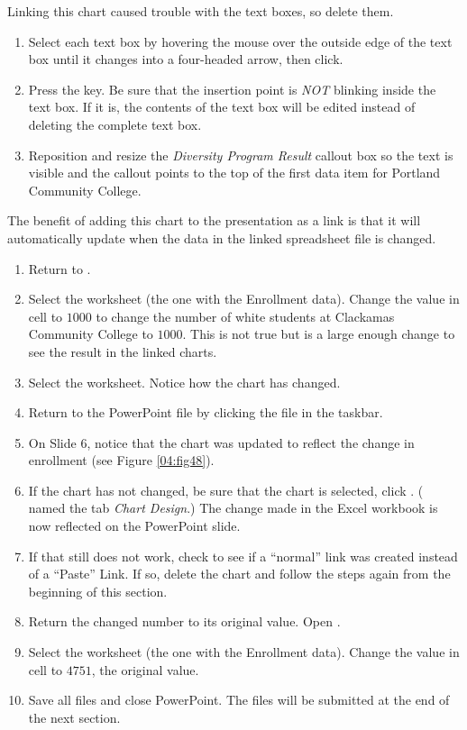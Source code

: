 Linking this chart caused trouble with the text boxes, so delete them.

\begin{enumerate}
	\item Select each text box by hovering the mouse over the outside edge of the text box until it changes into a four-headed arrow, then click.
	\item Press the  key. Be sure that the insertion point is \textit{NOT} blinking inside the text box. If it is, the contents of the text box will be edited instead of deleting the complete text box.
	\item Reposition and resize the \textit{Diversity Program Result} callout box so the text is visible and the callout points to the top of the first data item for Portland Community College.
\end{enumerate}

The benefit of adding this chart to the presentation as a link is that it will automatically update when the data in the linked spreadsheet file is changed.

\begin{enumerate}
	\item Return to .
	\item Select the  worksheet (the one with the Enrollment data). Change the value in cell  to $ 1000 $ to change the number of white students at Clackamas Community College to $ 1000 $. This is not true but is a large enough change to see the result in the linked charts.
	\item Select the  worksheet. Notice how the chart has changed.
	\item Return to the  PowerPoint file by clicking the file in the taskbar.
	\item On Slide $ 6 $, notice that the chart was updated to reflect the change in enrollment (see Figure \ref{04:fig48}).
	\item If the chart has not changed, be sure that the chart is selected, click . ( named the tab \textit{Chart Design}.) The change made in the Excel workbook is now reflected on the PowerPoint slide.
	\item If that still does not work, check to see if a ``normal'' link was created instead of a ``Paste'' Link. If so, delete the chart and follow the steps again from the beginning of this section.
	\item Return the changed number to its original value. Open .
	\item Select the  worksheet (the one with the Enrollment data). Change the value in cell  to $ 4751 $, the original value.
	\item Save all files and close PowerPoint. The files will be submitted at the end of the next section.
\end{enumerate}

